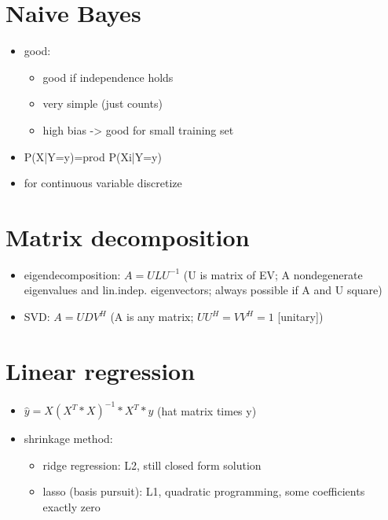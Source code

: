 \documentclass{article}
\begin{document}
\begin{multicols}{3}
\section{Naive Bayes}
\begin{itemize}
\item good:
\begin{itemize}
  \item good if independence holds
  \item very simple (just counts)
  \item high bias -> good for small training set
\end{itemize}
\item P(X|Y=y)=prod P(Xi|Y=y)
\item for continuous variable discretize
\end{itemize}

\section{Matrix decomposition}
\begin{itemize}
\item eigendecomposition: $A=ULU^{-1}$ (U is matrix of EV; A nondegenerate eigenvalues and lin.indep. eigenvectors; always possible if A and U square)
\item SVD: $A=UDV^H$ (A is any matrix; $UU^H=VV^H=1$ [unitary])
\end{itemize}

\section{Linear regression}
\begin{itemize}
\item $\hat{y}=X(X^T*X)^{-1}*X^T*y$ (hat matrix times y)
\item shrinkage method:
\begin{itemize}
  \item ridge regression: L2, still closed form solution
  \item lasso (basis pursuit): L1, quadratic programming, some coefficients exactly zero
\end{itemize}
\end{itemize}


\end{multicols}
\end{document}
